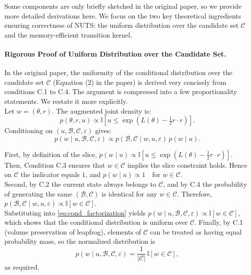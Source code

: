 \documentclass{article}
\begin{document}
\hspace*{0.53cm} Some components are only briefly sketched in the original paper, so we provide more detailed derivations here. We focus on the two key theoretical ingredients ensuring correctness of NUTS: the uniform distribution over the candidate set $\mathcal{C}$ and the memory-efficient transition kernel.

\paragraph{Rigorous Proof of Uniform Distribution over the Candidate Set.} In the original paper, the uniformity of the conditional distribution over the candidate set $\mathcal{C}$ (Equation (2) in the paper) is derived very concisely from conditions C.1 to C.4. The argument is compressed into a few proportionality statements. We restate it more explicitly.\\
Let $w=(\theta,r)$. The augmented joint density is:
\[
p(\theta,r,u) \propto \mathbb{I}\!\left[u \le \exp\!\left(L(\theta)-\tfrac12 r\cdot r\right)\right].
\]
Conditioning on $(u,\mathcal{B},\mathcal{C},\varepsilon)$ gives:
\begin{equation}
p(w \mid u,\mathcal{B},\mathcal{C},\varepsilon)
\propto p(\mathcal{B},\mathcal{C}\mid w,u,\varepsilon)\, p(w\mid u).
\label{eq:cond_factorization}
\end{equation}

First, by definition of the slice,
$p(w\mid u) \propto \mathbb{I}\!\left[u \le \exp\!\left(L(\theta)-\tfrac12 r\cdot r\right)\right]$. Then, Condition C.3 ensures that $w\in\mathcal{C}$ implies the slice constraint holds. Hence on $\mathcal{C}$ the indicator equals $1$, and $p(w\mid u) \propto 1 \quad \text{for } w\in\mathcal{C}$.\\
Second, by C.2 the current state always belongs to $\mathcal{C}$, and by C.4 the probability of generating the same $(\mathcal{B},\mathcal{C})$ is identical for any $w\in\mathcal{C}$. Therefore, $p(\mathcal{B},\mathcal{C}\mid w,u,\varepsilon)
\propto \mathbb{I}[w\in\mathcal{C}]$. \\
Substituting into \eqref{eq:cond_factorization} yields $p(w \mid u,\mathcal{B},\mathcal{C},\varepsilon)
\propto \mathbb{I}[w\in\mathcal{C}]$,
which shows that the conditional distribution is uniform over $\mathcal{C}$. Finally, by C.1 (volume preservation of leapfrog), elements of $\mathcal{C}$ can be treated as having equal probability mass, so the normalized distribution is
\[
p(w \mid u,\mathcal{B},\mathcal{C},\varepsilon)
= \frac{1}{|\mathcal{C}|}\,\mathbb{I}[w\in\mathcal{C}],
\]
as required. 
\end{document}
